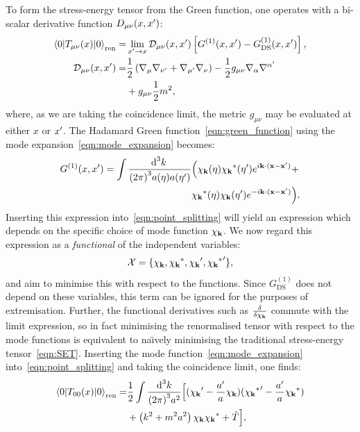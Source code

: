 To form the stress-energy tensor from the Green function, one operates with a bi-scalar derivative function \(D_{\mu\nu}(x,\prm{x})\):
\begin{align}
  \bracket{0}{T_{\mu\nu}(x)}{0}_\mathrm{ren} =& \lim\limits_{\prm{x}\to x} \mathcal{D}_{\mu\nu}(x,\prm{x}) \left[ G^{(1)}(x,\prm{x}) - G^{(1)}_\mathrm{DS}(x,\prm{x}) \right],
  \label{eqn:point_splitting}
  \\
  \mathcal{D}_{\mu\nu}(x,\prm{x})=& \frac{1}{2}\left( \nabla_{\mu}\nabla_{\prm{\nu}} + \nabla_{\prm{\mu}}\nabla_{\nu} \right) -\frac{1}{2} g_{\mu\nu} \nabla_\alpha \nabla^{\prm{\alpha}} \nonumber\\
  &+ g_{\mu\nu} \frac{1}{2}m^2,  \nonumber
\end{align}
where, as we are taking the coincidence limit, the metric \(g_{\mu\nu}\) may be evaluated at either \(x\) or \(\prm{x}\).
The Hadamard Green function~\eqref{eqn:green_function} using the mode expansion~\eqref{eqn:mode_expansion} becomes:
\begin{align}
  G^{(1)}(x,\prm{x}) = 
  \int\frac{\d[3]{k}\:}{{(2\pi)}^3a(\eta)a(\prm{\eta})}&
  \Big(
  \chi_\vk(\eta)
  \str{\chi_{\vk}}(\prm{\eta})e^{i\vk\cdot(\vx-\prm{\vx})}+\nonumber\\
  &
  \str{\chi_\vk}(\eta)
  \chi_{\vk}(\prm{\eta})e^{-i\vk\cdot(\vx-\prm{\vx})}
  \Big).
  \nonumber
\end{align}
Inserting this expression into~\eqref{eqn:point_splitting} will yield an expression which depends on the specific choice of mode function \(\chi_\vk\). We now regard this expression as a {\em functional\/} of the independent variables:
\begin{equation}
  \mathcal{X} = \{\chi_\vk,\str{\chi_\vk},\prm{\chi_\vk},\prm{\str{\chi_\vk}}\},
  \label{eqn:vars}
\end{equation}
and aim to minimise this with respect to the functions. Since \(G^{(1)}_{\mathrm{DS}}\) does not depend on these variables, this term can be ignored for the purposes of extremisation. Further, the functional derivatives such as \(\frac{\delta}{\delta \chi_\vk}\) commute with the limit expression, so in fact minimising the renormalised tensor with respect to the mode functions is equivalent to na\"{\i}vely minimising the traditional stress-energy tensor~\eqref{eqn:SET}. Inserting the mode function~\eqref{eqn:mode_expansion} into~\eqref{eqn:point_splitting} and taking the coincidence limit, one finds:
\begin{align}
  \bracket{0}{T_{00}(x)}{0}_\mathrm{ren} = &\frac{1}{2}\int \frac{\d[3]{k}}{{(2\pi)}^3 a^2} \Big[ (\prm{\chi_\vk}-\frac{\prm{a}}{a}\chi_\vk)(\prm{\str{\chi_\vk}}-\frac{\prm{a}}{a}\str{\chi_\vk})
  \nonumber \\
  &+\left( k^2 + m^2a^2 \right)\chi_\vk {\chi_\vk}^\ast + \tilde{T} \Big],
\end{align}
